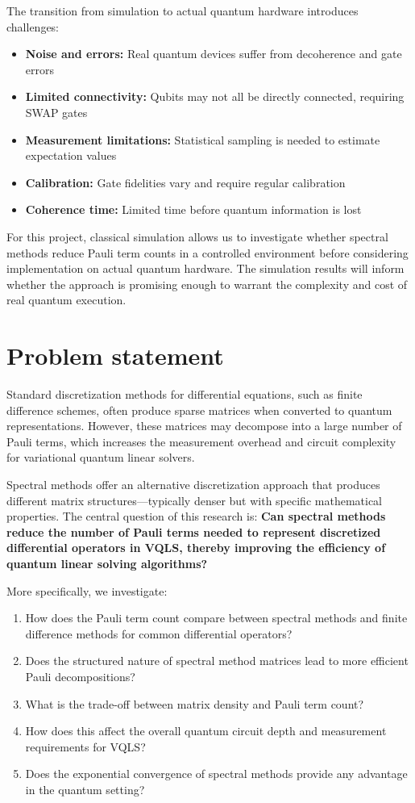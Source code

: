 \documentclass[a4paper,12pt]{amsart}
\begin{document}
The transition from simulation to actual quantum hardware introduces challenges:
\begin{itemize}
\item \textbf{Noise and errors:} Real quantum devices suffer from decoherence and gate errors
\item \textbf{Limited connectivity:} Qubits may not all be directly connected, requiring SWAP gates
\item \textbf{Measurement limitations:} Statistical sampling is needed to estimate expectation values
\item \textbf{Calibration:} Gate fidelities vary and require regular calibration
\item \textbf{Coherence time:} Limited time before quantum information is lost
\end{itemize}

For this project, classical simulation allows us to investigate whether spectral methods reduce Pauli term counts in a controlled environment before considering implementation on actual quantum hardware. The simulation results will inform whether the approach is promising enough to warrant the complexity and cost of real quantum execution.

\section{Problem statement}
Standard discretization methods for differential equations, such as finite difference schemes, often produce sparse matrices when converted to quantum representations. However, these matrices may decompose into a large number of Pauli terms, which increases the measurement overhead and circuit complexity for variational quantum linear solvers.

Spectral methods offer an alternative discretization approach that produces different matrix structures—typically denser but with specific mathematical properties. The central question of this research is: \textbf{Can spectral methods reduce the number of Pauli terms needed to represent discretized differential operators in VQLS, thereby improving the efficiency of quantum linear solving algorithms?}

More specifically, we investigate:
\begin{enumerate}
\item How does the Pauli term count compare between spectral methods and finite difference methods for common differential operators?
\item Does the structured nature of spectral method matrices lead to more efficient Pauli decompositions?
\item What is the trade-off between matrix density and Pauli term count?
\item How does this affect the overall quantum circuit depth and measurement requirements for VQLS?
\item Does the exponential convergence of spectral methods provide any advantage in the quantum setting?
\end{enumerate}
\end{document}
